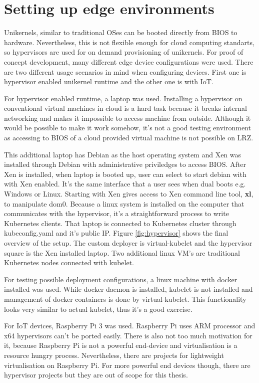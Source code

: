 
\section{Setting up edge environments}
Unikernels, similar to traditional OSes can be booted directly from BIOS to hardware. Nevertheless, this is not flexible enough for cloud computing standarts, so hypervisors are used for on demand provisioning of unikernels. For proof of concept development, many different edge device configurations were used. There are two different usage scenarios in mind when configuring devices. First one is hypervisor enabled unikernel runtime and the other one is with IoT.

For hypervisor enabled runtime, a laptop was used. Installing a hypervisor on conventional virtual machines in cloud is a hard task because it breaks internal networking and makes it impossible to access machine from outside. Although it would be possible to make it work somehow, it's not a good testing environment as accessing to BIOS of a cloud provided virtual machine is not possible on LRZ.

This additional laptop has Debian as the host operating system and Xen was installed through Debian with administrative priviledges to access BIOS. After Xen is installed, when laptop is booted up, user can select to start debian with with Xen enabled. It's the same interface that a user sees when dual boots e.g. Windows or Linux. Starting with Xen gives access to Xen command line tool, \textbf{xl}, to manipulate dom0. Because a linux system is installed on the computer that communicates with the hypervisor, it's a straightforward process to write Kubernetes clients. That laptop is connected to Kubernetes cluster through kubeconfig.yaml and it's public IP. Figure \ref{fig:hypervisor} shows the final overview of the setup. The custom deployer is virtual-kubelet and the hypervisor square is the Xen installed laptop. Two additional linux VM's are traditional Kubernetes nodes connected with kubelet.

For testing possible deployment configurations, a linux machine with docker installed was used. While docker daemon is installed, kubelet is not installed and management of docker containers is done by virtual-kubelet. This functionality looks very similar to actual kubelet, thus it's a good exercise.

For IoT devices, Raspberry Pi 3 was used. Raspberry Pi uses ARM processor and x64 hypervisors can't be ported easily. There is also not too much motivation for it, because Raspberry Pi is not a powerful end-device and virtualisation is a resource hungry process. Nevertheless, there are projects for lightweight virtualisation on Raspberry Pi. For more powerful end devices though, there are hypervisor projects but they are out of scope for this thesis.

